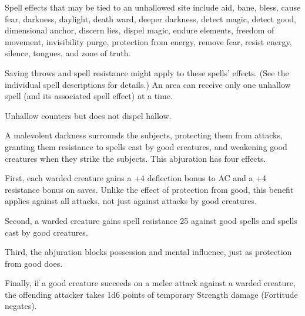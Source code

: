 \begin{multicols}{2}
\begin{small}
\smallskip\noindent Spell effects that may be tied to an unhallowed site include aid, bane, bless, cause fear, darkness, daylight, death ward, deeper darkness, detect magic, detect good, dimensional anchor, discern lies, dispel magic, endure elements, freedom of movement, invisibility purge, protection from energy, remove fear, resist energy, silence, tongues, and zone of truth.

\smallskip\noindent Saving throws and spell resistance might apply to these spells' effects. (See the individual spell descriptions for details.)
An area can receive only one unhallow spell (and its associated spell effect) at a time.

\smallskip\noindent Unhallow counters but does not dispel hallow.


\noindent A malevolent darkness surrounds the subjects, protecting them from attacks, granting them resistance to spells cast by good creatures, and weakening good creatures when they strike the subjects. This abjuration has four effects.

\smallskip\noindent First, each warded creature gains a +4 deflection bonus to AC and a +4 resistance bonus on saves. Unlike the effect of protection from good, this benefit applies against all attacks, not just against attacks by good creatures.

\smallskip\noindent Second, a warded creature gains spell resistance 25 against good spells and spells cast by good creatures.

\smallskip\noindent Third, the abjuration blocks possession and mental influence, just as protection from good does.

\smallskip\noindent Finally, if a good creature succeeds on a melee attack against a warded creature, the offending attacker takes 1d6 points of temporary Strength damage (Fortitude negates).



\end{small}
\end{multicols}
